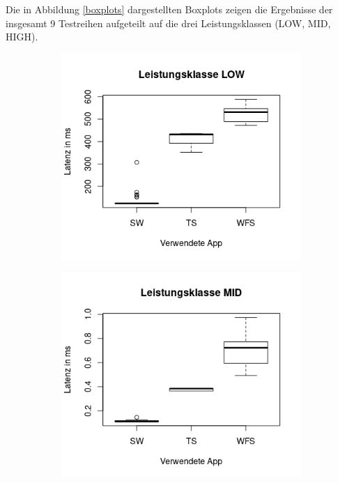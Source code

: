 Die in Abbildung \ref{boxplots} dargestellten Boxplots zeigen die Ergebnisse der insgesamt 9 Testreihen aufgeteilt auf die drei Leistungsklassen (LOW, MID, HIGH).


\begin{figure}[h]
\begin{subfigure}[b]{0.5\textwidth}
\includegraphics[width=\textwidth]{img/boxplotlow.png}
\end{subfigure}
\begin{subfigure}[b]{0.5\textwidth}
\includegraphics[width=\textwidth]{img/boxplotmid.png}

\end{subfigure}
\end{figure}
